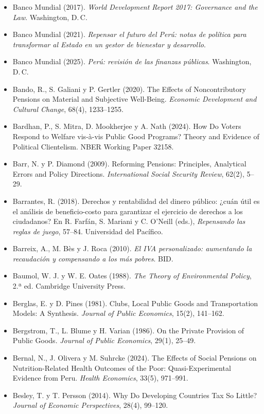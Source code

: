 \documentclass[11pt,a4paper]{article}
\begin{document}
{\begin{itemize}[leftmargin=1.4em,itemsep=1pt,label={}]
\item Banco Mundial (2017). \emph{World Development Report 2017: Governance and the Law}. Washington, D.\,C.
\item Banco Mundial (2021). \emph{Repensar el futuro del Perú: notas de política para transformar al Estado en un gestor de bienestar y desarrollo}.
\item Banco Mundial (2025). \emph{Perú: revisión de las finanzas públicas}. Washington, D.\,C.
\item Bando, R., S. Galiani y P. Gertler (2020). The Effects of Noncontributory Pensions on Material and Subjective Well-Being. \emph{Economic Development and Cultural Change}, 68(4), 1233--1255.
\item Bardhan, P., S. Mitra, D. Mookherjee y A. Nath (2024). How Do Voters Respond to Welfare vis-à-vis Public Good Programs? Theory and Evidence of Political Clientelism. NBER Working Paper 32158.
\item Barr, N. y P. Diamond (2009). Reforming Pensions: Principles, Analytical Errors and Policy Directions. \emph{International Social Security Review}, 62(2), 5--29.
\item Barrantes, R. (2018). Derechos y rentabilidad del dinero público: ¿cuán útil es el análisis de beneficio-costo para garantizar el ejercicio de derechos a los ciudadanos? En R. Farfán, S. Mariani y C. O'Neill (eds.), \emph{Repensando las reglas de juego}, 57--84. Universidad del Pacífico.
\item Barreix, A., M. Bès y J. Roca (2010). \emph{El IVA personalizado: aumentando la recaudación y compensando a los más pobres}. BID.
\item Baumol, W. J. y W. E. Oates (1988). \emph{The Theory of Environmental Policy}, 2.ª ed. Cambridge University Press.
\item Berglas, E. y D. Pines (1981). Clubs, Local Public Goods and Transportation Models: A Synthesis. \emph{Journal of Public Economics}, 15(2), 141--162.
\item Bergstrom, T., L. Blume y H. Varian (1986). On the Private Provision of Public Goods. \emph{Journal of Public Economics}, 29(1), 25--49.
\item Bernal, N., J. Olivera y M. Suhrcke (2024). The Effects of Social Pensions on Nutrition-Related Health Outcomes of the Poor: Quasi-Experimental Evidence from Peru. \emph{Health Economics}, 33(5), 971--991.
\item Besley, T. y T. Persson (2014). Why Do Developing Countries Tax So Little? \emph{Journal of Economic Perspectives}, 28(4), 99--120.

\end{itemize}}
\end{document}
